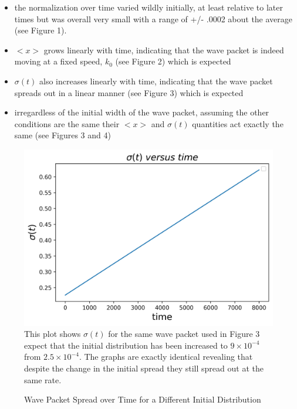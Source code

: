 \documentclass[twocolumn]{article}
\begin{document}
\begin{itemize}
\item the normalization over time varied wildly initially, at least relative to later times but was overall very small with a range of +/- .0002 about the average (see Figure 1).
\item $<x>$ grows linearly with time, indicating that the wave packet is indeed moving at a fixed speed, $k_0$ (see Figure 2) which is expected
\item $\sigma(t)$ also increases linearly with time, indicating that the wave packet spreads out in a linear manner (see Figure 3) which is expected
\item irregardless of the initial width of the wave packet, assuming the other conditions are the same their $<x>$ and $\sigma(t)$ quantities act exactly the same (see Figures 3 and 4)
\end{itemize}
\begin{figure}[h]
\centering
\caption{Wave Packet Spread over Time for a Different Initial Distribution}
\includegraphics[scale=.5]{sigma1b}
\small{This plot shows $\sigma(t)$ for the same wave packet used in Figure 3 expect that the initial distribution has been increased to $9\times10^{-4}$ from $2.5\times10^{-4}$. The graphs are exactly identical revealing that despite the change in the initial spread they still spread out at the same rate.}
\end{figure}
\end{document}
